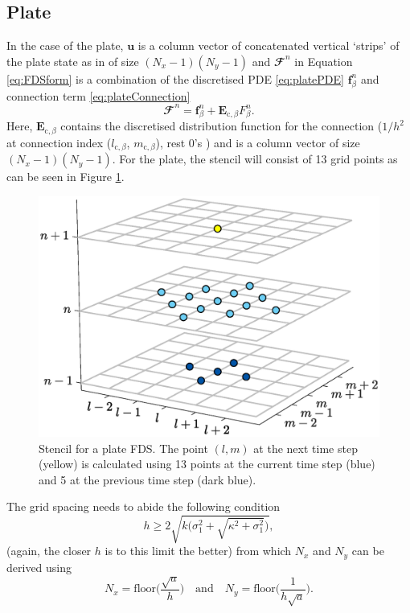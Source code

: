 \subsection{Plate}
In the case of the plate, $\mathbf{u}$ is a column vector of concatenated vertical `strips' of the plate state as in \cite{Bilbao2009:ModularPercussion} of size $(N_x-1)(N_y-1)$ and $\mathbfcal{F}^n$ in Equation \eqref{eq:FDSform} is a combination of the discretised PDE \eqref{eq:platePDE} $\mathbf{f}_\beta^n$ and connection term \eqref{eq:plateConnection}
\begin{equation}\label{eq:FDSplate}
    \mathbfcal{F}^n = \mathbf{f}_\beta^n + \mathbf{E}_{\text{c},\beta}F_\beta^n.
\end{equation}
Here, $\mathbf{E}_{\text{c},\beta}$ contains the discretised distribution function for the connection ($1/h^2$ at connection index ($l_{\text{c},\beta}$, $m_{\text{c},\beta}$), rest 0's \cite{Bilbao2009:ModularPercussion}) and is a column vector of size $(N_x-1)(N_y-1)$.
For the plate, the stencil will consist of 13 grid points as can be seen in Figure \ref{fig:stencil2D}.
\begin{figure}[h]
\centering
\includegraphics[width=\paperFigWidth\textwidth]{figures/stencil2Dedit.eps}
\caption{Stencil for a plate FDS. The point $(l,m)$ at the next time step (yellow) is calculated using 13 points at the current time step (blue) and 5 at the previous time step (dark blue). \label{fig:stencil2D}}
\end{figure}

\noindent The grid spacing needs to abide the following condition \cite{Bilbao2009:ModularPercussion}
\begin{equation}\label{eq:stabilityPlate}
h \geq 2\sqrt{k\bigg(\sigma_1^2 + \sqrt{\kappa^2+ \sigma_1^2}\bigg)},
\end{equation}
(again, the closer $h$ is to this limit the better) from which $N_x$ and $N_y$ can be derived using
\begin{equation}
    N_x = \text{floor}\Bigg(\frac{\sqrt{a}}{h}\Bigg) \quad \text{and} \quad
    N_y = \text{floor}\Bigg(\frac{1}{h\sqrt{a}}\Bigg).
\end{equation}

